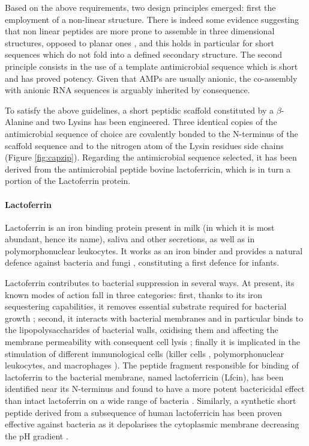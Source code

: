 Based on the above requirements, two design principles emerged: first the employment of a non-linear structure. There is indeed some evidence suggesting that non linear peptides are more prone to assemble in three dimensional structures, opposed to planar ones \cite{???}, and this holds in particular for short sequences which do not fold into a defined secondary structure.
%
The second principle consists in the use of a template antimicrobial sequence which is short and has proved potency.
%
Given that AMPs are usually anionic, the co-assembly with anionic RNA sequences is arguably inherited by consequence.

To satisfy the above guidelines, a short peptidic scaffold constituted by a $\beta$-Alanine and two Lysins has been engineered.
%
Three identical copies of the antimicrobial sequence of choice are covalently bonded to the N-terminus of the scaffold sequence and to the nitrogen atom of the Lysin residues side chains (Figure \ref{fig:capzip}).
%
Regarding the antimicrobial sequence selected, it has been derived from the antimicrobial peptide bovine lactoferricin, which is in turn a portion of the Lactoferrin protein.

\paragraph{Lactoferrin} Lactoferrin is an iron binding protein present in milk (in which it is most abundant, hence its name), saliva and other secretions, as well as in polymorphonuclear leukocytes.
%
It works as an iron binder and provides a natural defence against bacteria and fungi \cite{Sanchez1992,Arnold1977,Arnold1980,Kirkpatrick1971,Jahani2015}, constituting a first defence for infants.

Lactoferrin contributes to bacterial suppression in several ways. At present, its known modes of action fall in three categories: first, thanks to its iron sequestering capabilities, it removes essential substrate required for bacterial growth \cite{Farnaud2003}; second, it interacts with bacterial membranes and in particular binds to the lipopolysaccharides of bacterial walls, oxidising them and affecting the membrane permeability with consequent cell lysis \cite{Farnaud2003}; finally it is implicated in the stimulation of different immunological cells (killer cells \cite{Shau1992}, polymorphonuclear leukocytes, and macrophages \cite{Gahr1991}).
The peptide fragment responsible for binding of lactoferrin to the bacterial membrane, named lactoferricin (Lfcin), has been identified near its N-terminus and found to have a more potent bactericidal effect than intact lactoferrin on a wide range of bacteria \cite{Gifford2005,Bellamy1992,Tomita1994,Wakabayashi1996}.
%
Similarly, a synthetic short peptide derived from a subsequence of human lactoferricin has been proven effective against bacteria as it depolarises the cytoplasmic membrane decreasing the pH gradient \cite{Aguilera1999}.

